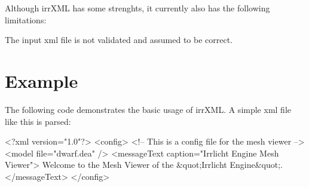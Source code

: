 Although irr\+X\+ML has some strenghts, it currently also has the following limitations\+:


\begin{DoxyItemize}
\item The input xml file is not validated and assumed to be correct.
\end{DoxyItemize}\hypertarget{index_irrxmlexample}{}\section{Example}\label{index_irrxmlexample}
The following code demonstrates the basic usage of irr\+X\+ML. A simple xml file like this is parsed\+: 
\begin{DoxyCode}
<?xml version=\textcolor{stringliteral}{"1.0"}?>
<config>
 <!-- This is a config file \textcolor{keywordflow}{for} the mesh viewer -->
 <model file=\textcolor{stringliteral}{"dwarf.dea"} />
 <messageText caption=\textcolor{stringliteral}{"Irrlicht Engine Mesh Viewer"}>
 Welcome to the Mesh Viewer of the &quot;Irrlicht Engine&quot;.
 </messageText>
</config>
\end{DoxyCode}


